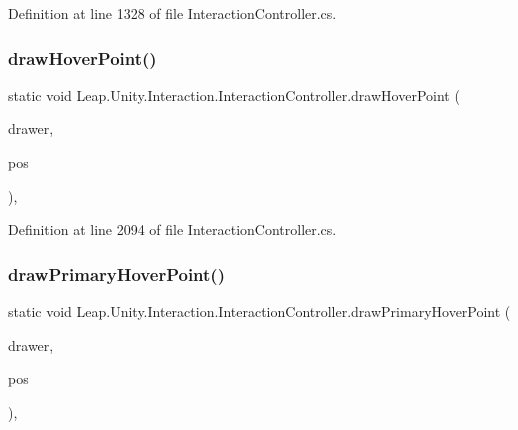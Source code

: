 Definition at line 1328 of file Interaction\+Controller.\+cs.

\mbox{\label{class_leap_1_1_unity_1_1_interaction_1_1_interaction_controller_a91d025406da30ca80629fd01898b6935}} 
\subsubsection{\texorpdfstring{drawHoverPoint()}{drawHoverPoint()}}
{\footnotesize\ttfamily static void Leap.\+Unity.\+Interaction.\+Interaction\+Controller.\+draw\+Hover\+Point (\begin{DoxyParamCaption}\item[{\mbox{\hyperlink{class_leap_1_1_unity_1_1_runtime_gizmos_1_1_runtime_gizmo_drawer}{Runtime\+Gizmo\+Drawer}}}]{drawer,  }\item[{Vector3}]{pos }\end{DoxyParamCaption})\hspace{0.3cm}{\ttfamily [static]}, {\ttfamily [protected]}}



Definition at line 2094 of file Interaction\+Controller.\+cs.

\mbox{\label{class_leap_1_1_unity_1_1_interaction_1_1_interaction_controller_abab3a785a24c9d0d028ca7757d7aa657}} 
\subsubsection{\texorpdfstring{drawPrimaryHoverPoint()}{drawPrimaryHoverPoint()}}
{\footnotesize\ttfamily static void Leap.\+Unity.\+Interaction.\+Interaction\+Controller.\+draw\+Primary\+Hover\+Point (\begin{DoxyParamCaption}\item[{\mbox{\hyperlink{class_leap_1_1_unity_1_1_runtime_gizmos_1_1_runtime_gizmo_drawer}{Runtime\+Gizmo\+Drawer}}}]{drawer,  }\item[{Vector3}]{pos }\end{DoxyParamCaption})\hspace{0.3cm}{\ttfamily [static]}, {\ttfamily [protected]}}



